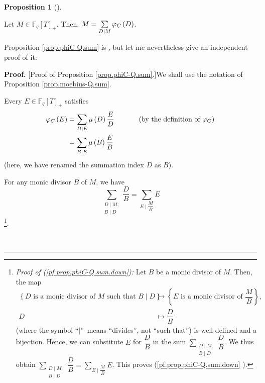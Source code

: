 \documentclass[numbers=enddot,12pt,final,onecolumn,notitlepage]{scrartcl}%
\theoremstyle{definition}
\newtheorem{prop}[theo]{Proposition}
\newenvironment{proposition}[1][]
{\begin{prop}[#1]\begin{leftbar}}
{\end{leftbar}\end{prop}}
\newenvironment{proof}[1][Proof]{\noindent\textbf{#1.} }{\ \rule{0.5em}{0.5em}}
\let\sumnonlimits\sum
\renewcommand{\sum}{\sumnonlimits\limits}
\begin{document}
\begin{proposition}
\label{prop.phiC-Q.sum}Let $M\in\mathbb{F}_{q}\left[  T\right]  _{+}$. Then,
$M=\sum\limits_{D\mid M}\varphi_{C}\left(  D\right)  $.
\end{proposition}

Proposition \ref{prop.phiC-Q.sum} is \cite[Theorem 4.6 (2)]{kc-carlitz}, but
let me nevertheless give an independent proof of it:

\begin{proof}
[Proof of Proposition \ref{prop.phiC-Q.sum}.]We shall use the notation of
Proposition \ref{prop.moebius-Q.sum}.

Every $E\in\mathbb{F}_{q}\left[  T\right]  _{+}$ satisfies%
\begin{align}
\varphi_{C}\left(  E\right)   &  =\sum\limits_{D\mid E}\mu\left(  D\right)
\dfrac{E}{D}\ \ \ \ \ \ \ \ \ \ \left(  \text{by the definition of }%
\varphi_{C}\right) \nonumber\\
&  =\sum_{B\mid E}\mu\left(  B\right)  \dfrac{E}{B}
\label{pf.prop.phiC-Q.sum.phiCE=}%
\end{align}
(here, we have renamed the summation index $D$ as $B$).

For any monic divisor $B$ of $M$, we have%
\begin{equation}
\sum_{\substack{D\mid M;\\B\mid D}}\dfrac{D}{B}=\sum_{E\mid\dfrac{M}{B}}E
\label{pf.prop.phiC-Q.sum.down}%
\end{equation}
\footnote{\textit{Proof of (\ref{pf.prop.phiC-Q.sum.down}):} Let $B$ be a
monic divisor of $M$. Then, the map%
\begin{align*}
\left\{  D\text{ is a monic divisor of }M\text{ such that }B\mid D\right\}
&  \rightarrow\left\{  E\text{ is a monic divisor of }\dfrac{M}{B}\right\}
,\\
D  &  \mapsto\dfrac{D}{B}%
\end{align*}
(where the symbol \textquotedblleft$\mid$\textquotedblright\ means
\textquotedblleft divides\textquotedblright, not \textquotedblleft such
that\textquotedblright) is well-defined and a bijection. Hence, we can
substitute $E$ for $\dfrac{D}{B}$ in the sum $\sum_{\substack{D\mid M;\\B\mid
D}}\dfrac{D}{B}$. We thus obtain $\sum_{\substack{D\mid M;\\B\mid D}}\dfrac
{D}{B}=\sum_{E\mid\dfrac{M}{B}}E$. This proves (\ref{pf.prop.phiC-Q.sum.down}%
).}.


\end{proof}
\end{document}
